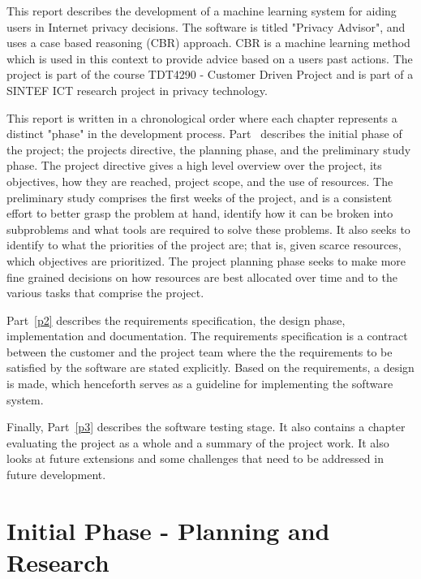 \documentclass[11pt,a4paper]{book}
\begin{document}
This report describes the development of a machine learning system for
aiding users in Internet privacy decisions. The software is titled
"Privacy Advisor", and uses a case based reasoning (CBR) approach. CBR
is a machine learning method  which is used in this context to provide
advice based on a users past actions. The project is part of the
course  TDT4290 - Customer Driven Project and is part of a SINTEF ICT
research project in privacy technology.

This report is written in a chronological order where each chapter
represents a  distinct "phase" in the development process.
Part~\ref{p1} describes the initial phase of the project; the projects
directive, the planning phase, and the preliminary study phase. The
project directive gives a high level overview over the project, its
objectives, how they are reached, project scope, and the use of resources. The preliminary study comprises the first weeks of the project, and is a consistent effort to better grasp the problem at hand, identify how it can be broken into subproblems and what tools are required to solve these problems. It also seeks to identify to what the priorities of the project are; that is, given scarce resources, which objectives are prioritized. The project planning phase seeks to make more fine grained decisions on how resources are best allocated over time and to the various tasks that comprise the project.

Part~\ref{p2} describes the requirements specification, the design phase, implementation and documentation. The requirements specification is a contract between the customer and the project team where the the requirements to be satisfied by the software are stated explicitly. Based on the requirements, a design is made, which henceforth serves as a guideline for implementing the software system.

Finally, Part~\ref{p3} describes the software testing stage. It also
contains a chapter evaluating the project as a whole and a summary of
the project work. It also looks at future extensions and some
challenges that need to be addressed in future development.

\part{Initial Phase - Planning and Research}\label{p1}
\addtocounter{chapter}{1}
\setcounter{section}{0}


\setcounter{section}{0}
\addtocounter{chapter}{1}

\end{document}
